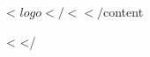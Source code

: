 \documentclass[a4paper,10pt]{article}
\begin{document}
<%
  ${logo}
</%

<%
</%

${content}

<%
</%
\end{document}
